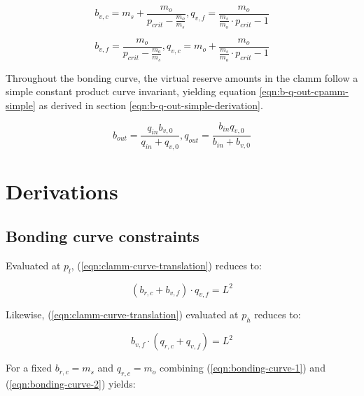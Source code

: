 \documentclass[table, twocolumn]{article}
\begin{document}
\begin{equation} \label{eqn:bonding-curve-setup}
  b_{v, c} = m_s + \frac{m_o}{p_{crit} - \frac{m_o}{m_s}},
  q_{v, f} = \frac{m_o}{\frac{m_s}{m_o} \cdot p_{crit} - 1}
\end{equation}

\begin{equation} \label{eqn:bonding-curve-transition}
  b_{v, f} = \frac{m_o}{p_{crit} - \frac{m_o}{m_s}},
  q_{v, c} = m_o + \frac{m_o}{\frac{m_s}{m_o} \cdot p_{crit} - 1}
\end{equation}

Throughout the bonding curve, the virtual reserve amounts in the \gls{clamm} follow a
simple constant product curve invariant, yielding equation
\ref{eqn:b-q-out-cpamm-simple} as derived in section
\ref{eqn:b-q-out-simple-derivation}.

\begin{equation} \label{eqn:b-q-out-cpamm-simple}
  b_{out} = \frac{q_{in} b_{v, 0}}{q_{in} + q_{v, 0}},
  q_{out} = \frac{b_{in} q_{v, 0}}{b_{in} + b_{v, 0}}
\end{equation}

\section{Derivations}

\subsection{Bonding curve constraints} \label{sec:bonding-curve-constraints}

Evaluated at $p_l$, (\ref{eqn:clamm-curve-translation}) reduces to:

\begin{equation} \label{eqn:bonding-curve-1}
  (b_{r, c} + b_{v, f}) \cdot q_{v, f} = L^2
\end{equation}

Likewise, (\ref{eqn:clamm-curve-translation}) evaluated at $p_h$ reduces to:

\begin{equation} \label{eqn:bonding-curve-2}
  b_{v, f} \cdot (q_{r, c} + q_{v, f}) = L^2
\end{equation}

For a fixed $b_{r, c} = m_s$ and $q_{r, c} = m_o$ combining (\ref{eqn:bonding-curve-1})
and (\ref{eqn:bonding-curve-2}) yields:
\end{document}
